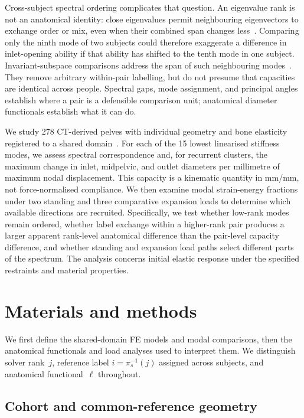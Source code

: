 \documentclass[pdflatex,sn-basic]{sn-jnl}
\begin{document}
Cross-subject spectral ordering complicates that question. An eigenvalue rank is not an anatomical identity: close eigenvalues permit neighbouring eigenvectors to exchange order or mix, even when their combined span changes less~\citep{Pierre1988,ManconiMace2017}. Comparing only the ninth mode of two subjects could therefore exaggerate a difference in inlet-opening ability if that ability has shifted to the tenth mode in one subject. Invariant-subspace comparisons address the span of such neighbouring modes~\citep{GhoshGhanem2012}. They remove arbitrary within-pair labelling, but do not presume that capacities are identical across people. Spectral gaps, mode assignment, and principal angles establish where a pair is a defensible comparison unit; anatomical diameter functionals establish what it can do.

We study 278 CT-derived pelves with individual geometry and bone elasticity registered to a shared domain~\citep{HenyssKuchar2025BoneDat}. For each of the 15 lowest linearised stiffness modes, we assess spectral correspondence and, for recurrent clusters, the maximum change in inlet, midpelvic, and outlet diameters per millimetre of maximum nodal displacement. This capacity is a kinematic quantity in mm/mm, not force-normalised compliance. We then examine modal strain-energy fractions under two standing and three comparative expansion loads to determine which available directions are recruited. Specifically, we test whether low-rank modes remain ordered, whether label exchange within a higher-rank pair produces a larger apparent rank-level anatomical difference than the pair-level capacity difference, and whether standing and expansion load paths select different parts of the spectrum. The analysis concerns initial elastic response under the specified restraints and material properties.

\section{Materials and methods}
\label{sec:methods}

We first define the shared-domain FE models and modal comparisons, then the anatomical functionals and load analyses used to interpret them. We distinguish solver rank~$j$, reference label $i=\pi_s^{-1}(j)$ assigned across subjects, and anatomical functional~$\ell$ throughout.


\subsection{Cohort and common-reference geometry}
\label{sec:cohort}
\end{document}
